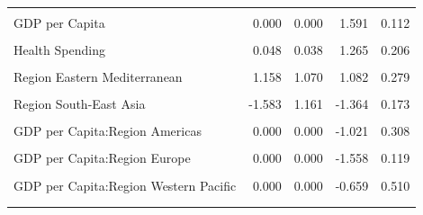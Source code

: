 \documentclass[
]{article}
\begin{document}
\begin{longtable}[t]{>{\raggedright\arraybackslash}m{4.5cm}rrrr}
\endfoot
\bottomrule
\endlastfoot
\cellcolor[HTML]{f5f5f5}{Intercept} & \cellcolor[HTML]{f5f5f5}{0.377} & \cellcolor[HTML]{f5f5f5}{0.411} & \cellcolor[HTML]{f5f5f5}{0.917} & \cellcolor[HTML]{f5f5f5}{0.359}\\
GDP per Capita & 0.000 & 0.000 & 1.591 & 0.112\\
\cellcolor[HTML]{f5f5f5}{Gini Index} & \cellcolor[HTML]{f5f5f5}{4.551} & \cellcolor[HTML]{f5f5f5}{0.966} & \cellcolor[HTML]{f5f5f5}{4.711} & \cellcolor[HTML]{f5f5f5}{0.000}\\
Health Spending & 0.048 & 0.038 & 1.265 & 0.206\\
\cellcolor[HTML]{f5f5f5}{Region Americas} & \cellcolor[HTML]{f5f5f5}{2.558} & \cellcolor[HTML]{f5f5f5}{0.703} & \cellcolor[HTML]{f5f5f5}{3.639} & \cellcolor[HTML]{f5f5f5}{0.000}\\
\addlinespace
Region Eastern Mediterranean & 1.158 & 1.070 & 1.082 & 0.279\\
\cellcolor[HTML]{f5f5f5}{Region Europe} & \cellcolor[HTML]{f5f5f5}{5.938} & \cellcolor[HTML]{f5f5f5}{0.502} & \cellcolor[HTML]{f5f5f5}{11.836} & \cellcolor[HTML]{f5f5f5}{0.000}\\
Region South-East Asia & -1.583 & 1.161 & -1.364 & 0.173\\
\cellcolor[HTML]{f5f5f5}{Region Western Pacific} & \cellcolor[HTML]{f5f5f5}{5.499} & \cellcolor[HTML]{f5f5f5}{1.081} & \cellcolor[HTML]{f5f5f5}{5.087} & \cellcolor[HTML]{f5f5f5}{0.000}\\
GDP per Capita:Region Americas & 0.000 & 0.000 & -1.021 & 0.308\\
\addlinespace
\cellcolor[HTML]{f5f5f5}{GDP per Capita:Region Eastern Mediterranean} & \cellcolor[HTML]{f5f5f5}{0.000} & \cellcolor[HTML]{f5f5f5}{0.000} & \cellcolor[HTML]{f5f5f5}{-1.353} & \cellcolor[HTML]{f5f5f5}{0.176}\\
GDP per Capita:Region Europe & 0.000 & 0.000 & -1.558 & 0.119\\
\cellcolor[HTML]{f5f5f5}{GDP per Capita:Region South-East Asia} & \cellcolor[HTML]{f5f5f5}{0.000} & \cellcolor[HTML]{f5f5f5}{0.000} & \cellcolor[HTML]{f5f5f5}{-0.410} & \cellcolor[HTML]{f5f5f5}{0.682}\\
GDP per Capita:Region Western Pacific & 0.000 & 0.000 & -0.659 & 0.510\\
\cellcolor[HTML]{f5f5f5}{Gini Index:Region Americas} & \cellcolor[HTML]{f5f5f5}{-7.475} & \cellcolor[HTML]{f5f5f5}{1.431} & \cellcolor[HTML]{f5f5f5}{-5.222} & \cellcolor[HTML]{f5f5f5}{0.000}\\
\addlinespace

\end{longtable}
\end{document}
